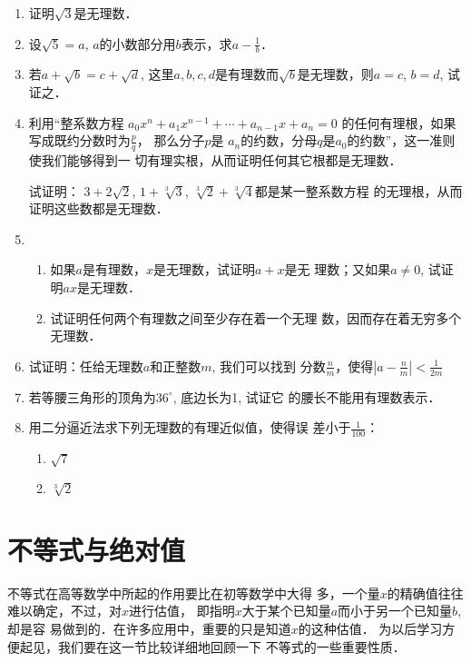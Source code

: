 \begin{enumerate}
    \item 证明$\sqrt{3}$是无理数．
    \item 设$\sqrt{5}=a$, $a$的小数部分用$b$表示，求$a-\frac{1}{b}$．
\item 若$a+\sqrt{b}=c+\sqrt{d}$, 这里$a,b,c,d$是有理数而$\sqrt{b}$是无理数，则$a=c$, $b=d$, 试证之．

\item 利用“整系数方程
$a_0x^n+a_1x^{n-1}+\cdots+a_{n-1}x+a_n=0$
的任何有理根，如果写成既约分数时为$\frac{p}{q}$，
那么分子$p$是
$a_n$的约数，分母$q$是$a_0$的约数”，这一准则使我们能够得到一
切有理实根，从而证明任何其它根都是无理数．

试证明：
$3+2\sqrt{2}$, $1+\sqrt[3]{3}$, $\sqrt[3]{2}+\sqrt[3]{4}$都是某一整系数方程
的无理根，从而证明这些数都是无理数．
\item \begin{enumerate}
    \item 如果$a$是有理数，$x$是无理数，试证明$a+x$是无
理数；又如果$a\ne 0$, 试证明$ax$是无理数．
\item 试证明任何两个有理数之间至少存在着一个无理
数，因而存在着无穷多个无理数．
\end{enumerate}

\item 试证明：任给无理数$a$和正整数$m$, 我们可以找到
分数$\frac{n}{m}$，使得$\left|a-\frac{n}{m}\right|<\frac{1}{2m}$
\item 若等腰三角形的顶角为$36^{\circ}$, 底边长为1, 试证它
的腰长不能用有理数表示．
\item 用二分逼近法求下列无理数的有理近似值，使得误
差小于$\frac{1}{100}$：
\begin{multicols}{2}
    \begin{enumerate}
        \item $\sqrt{7}$
        \item $\sqrt[3]{2}$
    \end{enumerate}
\end{multicols}
\end{enumerate}

\section{不等式与绝对值}
不等式在高等数学中所起的作用要比在初等数学中大得
多，一个量$x$的精确值往往难以确定，不过，对$x$进行估值，
即指明$x$大于某个已知量$a$而小于另一个已知量$b$, 却是容
易做到的．在许多应用中，重要的只是知道$x$的这种估值．
为以后学习方便起见，我们要在这一节比较详细地回顾一下
不等式的一些重要性质．

